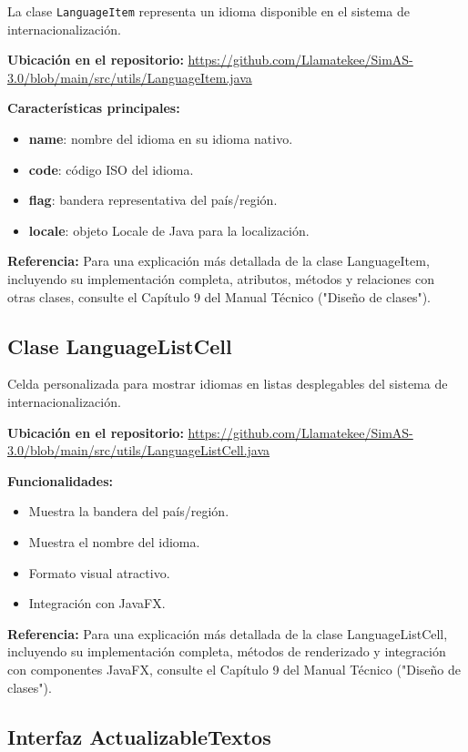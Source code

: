 La clase \texttt{LanguageItem} representa un idioma disponible en el sistema de internacionalización.

\textbf{Ubicación en el repositorio:} \url{https://github.com/Llamatekee/SimAS-3.0/blob/main/src/utils/LanguageItem.java}

\textbf{Características principales:}

\begin{itemize}
    \item \textbf{name}: nombre del idioma en su idioma nativo.
    \item \textbf{code}: código ISO del idioma.
    \item \textbf{flag}: bandera representativa del país/región.
    \item \textbf{locale}: objeto Locale de Java para la localización.
\end{itemize}

\textbf{Referencia:} Para una explicación más detallada de la clase LanguageItem, incluyendo su implementación completa, atributos, métodos y relaciones con otras clases, consulte el Capítulo 9 del Manual Técnico ("Diseño de clases").

\subsection{Clase LanguageListCell}

Celda personalizada para mostrar idiomas en listas desplegables del sistema de internacionalización.

\textbf{Ubicación en el repositorio:} \url{https://github.com/Llamatekee/SimAS-3.0/blob/main/src/utils/LanguageListCell.java}

\textbf{Funcionalidades:}

\begin{itemize}
    \item Muestra la bandera del país/región.
    \item Muestra el nombre del idioma.
    \item Formato visual atractivo.
    \item Integración con JavaFX.
\end{itemize}

\textbf{Referencia:} Para una explicación más detallada de la clase LanguageListCell, incluyendo su implementación completa, métodos de renderizado y integración con componentes JavaFX, consulte el Capítulo 9 del Manual Técnico ("Diseño de clases").

\subsection{Interfaz ActualizableTextos}

